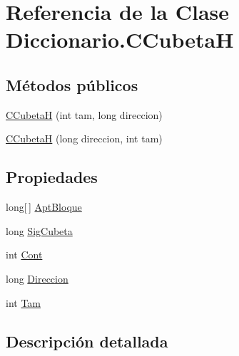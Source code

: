 \hypertarget{class_diccionario_1_1_c_cubeta_h}{\section{Referencia de la Clase Diccionario.\-C\-Cubeta\-H}
\label{class_diccionario_1_1_c_cubeta_h}
}
\subsection*{Métodos públicos}
\begin{DoxyCompactItemize}
\item 
\hyperlink{class_diccionario_1_1_c_cubeta_h_a3b10200db6495ffa51986dd042027bde}{C\-Cubeta\-H} (int tam, long direccion)
\item 
\hyperlink{class_diccionario_1_1_c_cubeta_h_afd292308bf364672fcded9a8c859641c}{C\-Cubeta\-H} (long direccion, int tam)
\end{DoxyCompactItemize}
\subsection*{Propiedades}
\begin{DoxyCompactItemize}
\item 
long\mbox{[}$\,$\mbox{]} \hyperlink{class_diccionario_1_1_c_cubeta_h_ab05cdfaf45a39b994dd4d95c7e441e75}{Apt\-Bloque}
\item 
long \hyperlink{class_diccionario_1_1_c_cubeta_h_a7fdc9085d4c1620faf00e75bced75fdd}{Sig\-Cubeta}
\item 
int \hyperlink{class_diccionario_1_1_c_cubeta_h_a6aa13e9752f773a861f70ed202d85b88}{Cont}
\item 
long \hyperlink{class_diccionario_1_1_c_cubeta_h_a8d6582c916b381c79137454cbf18ff95}{Direccion}
\item 
int \hyperlink{class_diccionario_1_1_c_cubeta_h_a2d9ab2991a882be8145176f5e539c392}{Tam}
\end{DoxyCompactItemize}


\subsection{Descripción detallada}



